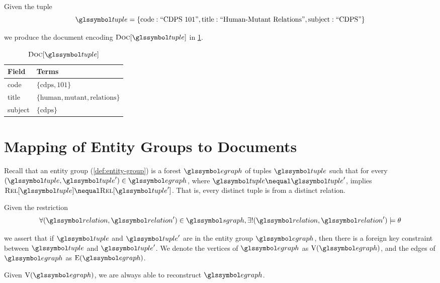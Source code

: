 		\begin{ex}
			Given the tuple
			\[
				\tuple = \{\text{code}: \text{``CDPS 101''}, \text{title}: \text{``Human-Mutant Relations''}, \text{subject}: \text{``CDPS''}\}
			\]
			
			we produce the document encoding \(\docs{\tuple}\) in \cref{tbl:docs-tuple}.
			
			\begin{table}
				\centering
				
				\begin{tabular}{ll}
					\toprule
					Field & Terms \\
					\midrule
					code & \(\{\text{cdps}, \text{101}\}\) \\
					title & \(\{\text{human}, \text{mutant}, \text{relations}\}\) \\
					subject & \(\{\text{cdps}\}\) \\
					\bottomrule
				\end{tabular}
				
				\caption{\(\docs{\tuple}\)}
				\label{tbl:docs-tuple}
			\end{table}
		\end{ex}

	
	\section{Mapping of Entity Groups to Documents}
	\label{sec:mapping-entity-groups-to-documents}
		Recall that an entity group (\cref{def:entity-group}) is a forest \(\egraph\) of tuples \(\tuple\) such that for every \((\tuple, \tuple') \in \egraph\), where \(\tuple \nequal \tuple'\), implies \(\relations{\tuple} \nequal \relations{\tuple'}\).  That is, every distinct tuple is from a distinct relation.
		
		Given the restriction
		\[
			\forall (\relation, \relation') \in \sgraph, \exists! (\relation, \relation') \models \theta
		\]
		
		we assert that if \(\tuple\) and \(\tuple'\) are in the entity group \(\egraph\), then there is a foreign key constraint between \(\tuple\) and \(\tuple'\).  We denote the vertices of \(\egraph\) as \(\text{V}(\egraph)\), and the edges of \(\egraph\) as \(\text{E}(\egraph)\).
		
		\begin{claim}
		\label{clm:lossless}
			Given \(\text{V}(\egraph)\), we are always able to reconstruct \(\egraph\).
		\end{claim}
		
